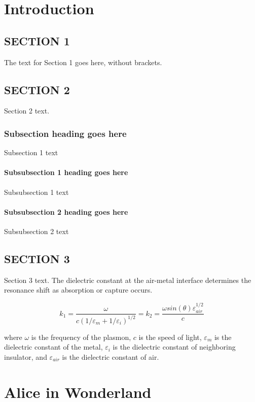\documentclass[phd,tocprelim]{cornell}
\begin{document}
\chapter{Introduction}

\section{SECTION 1}
The text for Section 1 goes here, without brackets.

\section{SECTION 2}
Section 2 text.

\subsection{Subsection heading goes here}

Subsection 1 text

\subsubsection{Subsubsection 1 heading goes here}
Subsubsection 1 text

\subsubsection{Subsubsection 2 heading goes here}
Subsubsection 2 text

\section{SECTION 3}
Section 3 text. The dielectric constant at the air-metal interface
determines the resonance shift as absorption or capture occurs.

\begin{equation}
k_1=\frac{\omega }{c({1/\varepsilon_m + 1/\varepsilon_i})^{1/2}}=k_2=\frac{\omega
sin(\theta)\varepsilon_{air}^{1/2}}{c}
\end{equation}

\noindent
where $\omega$ is the frequency of the plasmon, $c$ is the speed of
light, $\varepsilon_m$ is the dielectric constant of the metal,
$\varepsilon_i$ is the dielectric constant of neighboring insulator,
and $\varepsilon_{air}$ is the dielectric constant of air.

\chapter{Alice in Wonderland}
\end{document}
